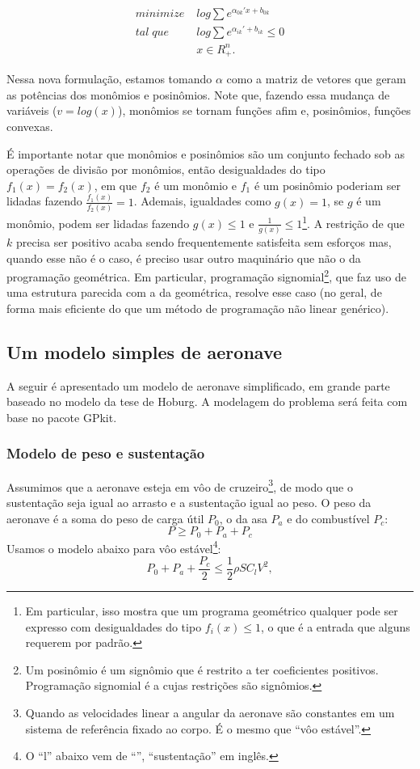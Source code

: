 \begin{align*}
  minimize \;& log \sum e^{\alpha_{0k}'x + b_{0k}}\\ tal\; que\;& log
  \sum e^{\alpha_{ik}' + b_{ik}} \leq 0\\ & x \in R^n_{+}.
\end{align*}

Nessa nova formulação, estamos tomando $\alpha$ como a matriz de
vetores que geram as potências dos monômios e posinômios. Note que,
fazendo essa mudança de variáveis ($v = log(x)$), monômios se tornam
funções afim e, posinômios, funções convexas.

É importante notar que monômios e posinômios são um conjunto fechado
sob as operações de divisão por monômios, então desigualdades do tipo
$f_1(x) = f_2(x)$, em que $f_2$ é um monômio e $f_1$ é um posinômio
poderiam ser lidadas fazendo $\frac{f_1(x)}{f_2(x)} = 1$. Ademais,
igualdades como $g(x) = 1$, se $g$ é um monômio, podem ser lidadas
fazendo $g(x) \leq 1$ e $\frac{1}{g(x)} \leq 1$\footnote{Em
  particular, isso mostra que um programa geométrico qualquer pode ser
  expresso com desigualdades do tipo $f_i(x) \leq 1$, o que é a
  entrada que alguns  requerem por padrão.}. A
restrição de que $k$ precisa ser positivo acaba sendo frequentemente
satisfeita sem esforços mas, quando esse não é o caso, é preciso
usar outro maquinário que não o da programação geométrica. Em
particular, programação signomial\footnote{Um posinômio é um signômio
  que é restrito a ter coeficientes positivos. Programação signomial é
  a cujas restrições são signômios.}, que faz uso de uma estrutura
parecida com a da geométrica, resolve esse caso (no geral, de forma
mais eficiente do que um método de programação não linear
genérico).

\subsection{Um modelo simples de aeronave}


A seguir é apresentado um modelo de aeronave simplificado, em grande
parte baseado no modelo da tese de Hoburg\cite{hoburg}. A modelagem do
problema será feita com base no pacote GPkit\cite{gpkit}. %

\subsubsection{Modelo de peso e sustentação}

Assumimos que a aeronave esteja em vôo de cruzeiro\footnote{Quando as
  velocidades linear a angular da aeronave são constantes em um
  sistema de referência fixado ao corpo. É o mesmo que ``vôo
  estável''.}, de modo que o sustentação seja igual ao arrasto e a
sustentação igual ao peso. O peso da aeronave é a soma do peso de
carga útil $P_0$, o da asa $P_a$ e do combustível $P_c$:
\[
P \geq P_0 + P_a + P_c
\]
Usamos o modelo abaixo para vôo estável\footnote{O ``l'' abaixo vem de
  ``'', ``sustentação'' em inglês.}:
\[
  P_0 + P_a + \frac{P_c}{2} \leq \frac{1}{2} \rho S C_l V^2,
\]

